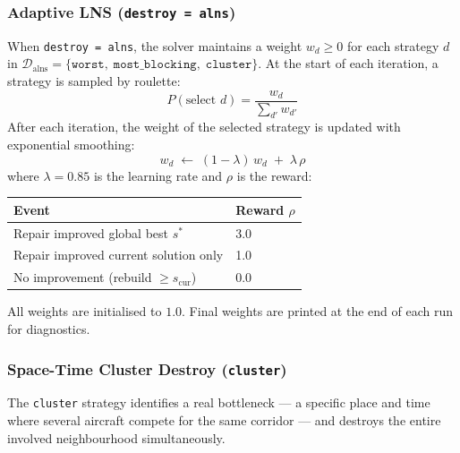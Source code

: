 \subsubsection{Adaptive LNS (\texttt{destroy = alns})}
\label{sec:alns}

When \texttt{destroy = alns}, the solver maintains a weight $w_d \geq 0$ for
each strategy $d$ in
$\mathcal{D}_{\text{alns}} = \{\texttt{worst},\;\texttt{most\_blocking},\;\texttt{cluster}\}$.
At the start of each iteration, a strategy is sampled by roulette:
\begin{equation}
    P(\text{select } d) = \frac{w_d}{\sum_{d'} w_{d'}}
    \label{eq:alns-roulette}
\end{equation}
After each iteration, the weight of the selected strategy is updated with
exponential smoothing:
\begin{equation}
    w_d \;\leftarrow\; (1 - \lambda)\,w_d \;+\; \lambda\,\rho
    \label{eq:alns-update}
\end{equation}
where $\lambda = 0.85$ is the learning rate and $\rho$ is the reward:
\begin{center}
\begin{tabular}{ll}
\toprule
Event & Reward $\rho$ \\
\midrule
Repair improved global best $s^*$ & 3.0 \\
Repair improved current solution only & 1.0 \\
No improvement (rebuild $\geq s_{\text{cur}}$) & 0.0 \\
\bottomrule
\end{tabular}
\end{center}
All weights are initialised to $1.0$.  Final weights are printed at the end of
each run for diagnostics.

\subsubsection{Space-Time Cluster Destroy (\texttt{cluster})}
\label{sec:cluster-destroy}

The \texttt{cluster} strategy identifies a real bottleneck — a specific place
and time where several aircraft compete for the same corridor — and destroys
the entire involved neighbourhood simultaneously.

